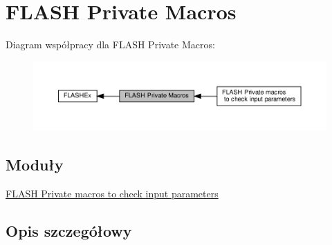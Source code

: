 \hypertarget{group___f_l_a_s_h_ex___private___macros}{}\section{F\+L\+A\+SH Private Macros}
\label{group___f_l_a_s_h_ex___private___macros}
Diagram współpracy dla F\+L\+A\+SH Private Macros\+:\nopagebreak
\begin{figure}[H]
\begin{center}
\leavevmode
\includegraphics[width=350pt]{group___f_l_a_s_h_ex___private___macros}
\end{center}
\end{figure}
\subsection*{Moduły}
\begin{DoxyCompactItemize}
\item 
\hyperlink{group___f_l_a_s_h_ex___i_s___f_l_a_s_h___definitions}{F\+L\+A\+S\+H Private macros to check input parameters}
\end{DoxyCompactItemize}


\subsection{Opis szczegółowy}
